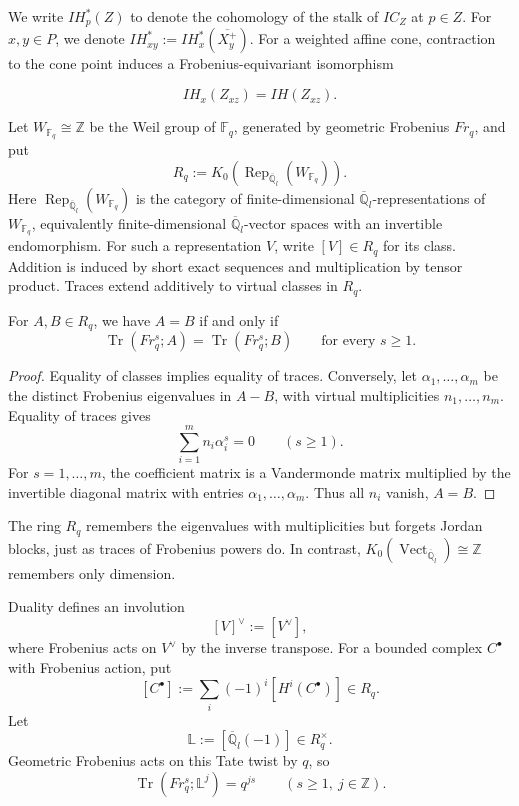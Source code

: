 \documentclass[a4paper]{article}
\newcommand\LL{{\mathbb{L}}}
\newcommand\Qlb{{\overline{\mathbb{Q}}_l}}
\begin{document}
We write $IH_p^*(Z)$ to denote the cohomology of the stalk of $IC_Z$ at $p\in Z$. For $x,y\in P$, we denote $IH^*_{xy}:=IH^*_{x}(\overline{X^+_y})$. For a weighted affine cone, contraction to the cone point induces a Frobenius-equivariant isomorphism~\cite[Lemma~4.5(a)]{KazhdanLusztig1980} 

\begin{equation}
        IH_x(Z_{xz})=IH(Z_{xz}).
        \label{eq:IH_cone_pt}
\end{equation}

Let $W_{\mathbb F_q}\cong\mathbb Z$ be the Weil group of $\mathbb F_q$, generated by geometric Frobenius $Fr_q$, and put
\[
        R_q:=K_0\!\left(\operatorname{Rep}_{\Qlb}(W_{\mathbb F_q})\right).
\]
Here $\operatorname{Rep}_{\Qlb}(W_{\mathbb F_q})$ is the category of finite-dimensional $\Qlb$-representations of $W_{\mathbb F_q}$, equivalently finite-dimensional $\Qlb$-vector spaces with an invertible endomorphism. For such a representation $V$, write $[V]\in R_q$ for its class. Addition is induced by short exact sequences and multiplication by tensor product. Traces extend additively to virtual classes in $R_q$.

\begin{lemma}{}
        For $A,B\in R_q$, we have $A=B$ if and only if
        \[
                \operatorname{Tr}(Fr_q^s;A)=\operatorname{Tr}(Fr_q^s;B)
                \qquad\text{for every }s\geq 1.
        \]
        \begin{proof}
                Equality of classes implies equality of traces. Conversely, let $\alpha_1,\dots,\alpha_m$ be the distinct Frobenius eigenvalues in $A-B$, with virtual multiplicities $n_1,\dots,n_m$. Equality of traces gives
                \[
                        \sum_{i=1}^m n_i\alpha_i^s=0\qquad(s\geq 1).
                \]
                For $s=1,\dots,m$, the coefficient matrix is a Vandermonde matrix multiplied by the invertible diagonal matrix with entries $\alpha_1,\dots,\alpha_m$. Thus all $n_i$ vanish, $A=B$.
        \end{proof}
\end{lemma}
The ring $R_q$ remembers the eigenvalues with multiplicities but forgets Jordan blocks, just as traces of Frobenius powers do. In contrast, $K_0(\operatorname{Vect}_{\Qlb})\cong\mathbb Z$ remembers only dimension.

Duality defines an involution
\[
        [V]^\vee:=[V^\vee],
\]
where Frobenius acts on $V^\vee$ by the inverse transpose. For a bounded complex $C^\bullet$ with Frobenius action, put
\[
        [C^\bullet]:=\sum_i(-1)^i[H^i(C^\bullet)]\in R_q.
\]
Let
\[
        \LL:=[\Qlb(-1)]\in R^\times_q.
\]
Geometric Frobenius acts on this Tate twist by $q$, so
\[
        \operatorname{Tr}(Fr_q^s;\LL^j)=q^{js}
        \qquad(s\geq 1,\ j\in\mathbb Z).
\]
\end{document}
